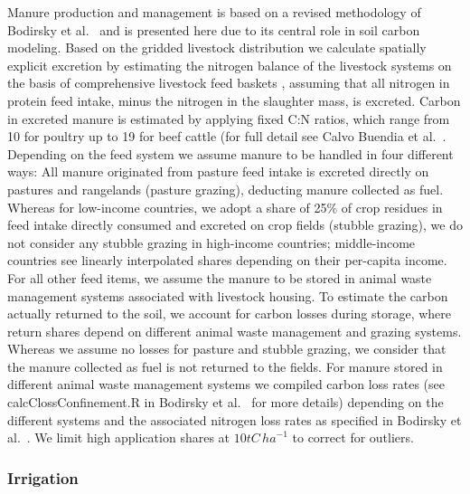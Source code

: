 \documentclass[gc, manuscript]{copernicus}
\begin{document}
Manure production and management is based on a revised methodology of Bodirsky et al.~\citeyearpar{bodirsky_n2o_2012} and is presented here due to its central role in soil carbon modeling. Based on the gridded livestock distribution we calculate spatially explicit excretion by estimating the nitrogen balance of the livestock systems on the basis of comprehensive livestock feed baskets \citep{weindl_livestock_2017}, assuming that all nitrogen in protein feed intake, minus the nitrogen in the slaughter mass, is excreted. Carbon in excreted manure is estimated by applying fixed C:N ratios, which range from 10 for poultry up to 19 for beef cattle (for full detail see Calvo Buendia et al.~\citeyearpar{calvo_buendia_ipcc_2019}.
Depending on the feed system we assume manure to be handled in four different ways:
All manure originated from pasture feed intake is excreted directly on pastures and rangelands (pasture grazing), deducting manure collected as fuel.
Whereas for low-income countries, we adopt a share of 25\% of crop residues in feed intake directly consumed and excreted on crop fields (stubble grazing), we do not consider any stubble grazing in high-income countries; middle-income countries see linearly interpolated shares depending on their per-capita income.
For all other feed items, we assume the manure to be stored in animal waste management systems associated with livestock housing.
To estimate the carbon actually returned to the soil, we account for carbon losses during storage, where return shares depend on different animal waste management and grazing systems. Whereas we assume no losses for pasture and stubble grazing, we consider that the manure collected as fuel is not returned to the fields. For manure stored in different animal waste management systems we compiled carbon loss rates (see calcClossConfinement.R in Bodirsky et al.~\citeyearpar{bodirsky_mrcommons_2020} for more details) depending on the different systems and the associated nitrogen loss rates as specified in Bodirsky et al.~\citeyearpar{bodirsky_n2o_2012}. We limit high application shares at \(10\unit{tC\,ha}^{-1}\) to correct for outliers.

\hypertarget{sec:irrigation}{%
\subsubsection{Irrigation}\label{sec:irrigation}}
\end{document}
